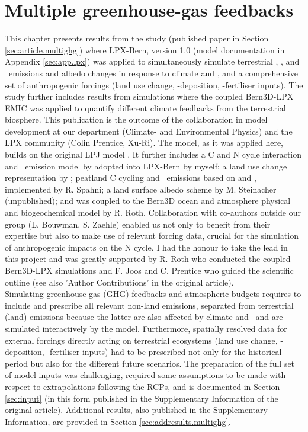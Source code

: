 \chapter{Multiple greenhouse-gas feedbacks}
\label{sec:multiGHG}
This chapter presents results from the study (published paper in Section \ref{sec:article.multighg}) where LPX-Bern, version 1.0 (model documentation in Appendix \ref{sec:app.lpx}) was applied to simultaneously simulate terrestrial \coo , \nno , and \chh\ emissions and albedo changes in response to climate and \coo , and a comprehensive set of anthropogenic forcings (land use change, \nr -deposition, \nr -fertiliser inputs). The study further includes results from simulations where the coupled Bern3D-LPX EMIC was applied to quantify different climate feedbacks from the terrestrial biosphere. This publication is the outcome of the collaboration in model development at our department (Climate- and Environmental Physics) and the LPX community (Colin Prentice, Xu-Ri). The model, as it was applied here, builds on the original LPJ model \citep{sitch03gcb}. It further includes a C and N cycle interaction and \nno\ emission model by \citet{xuri08gcb} adopted into LPX-Bern by myself; a land use change representation by \citet{strassmann08tel}; peatland C cycling and \chh\ emissions based on \citet{wania09gbca} and \citet{spahni11bg}, implemented by R. Spahni; a land surface albedo scheme by M. Steinacher (unpublished); and was coupled to the Bern3D ocean and atmosphere physical and biogeochemical model by R. Roth. Collaboration with co-authors outside our group (L. Bouwman, S. Zaehle) enabled us not only to benefit from their expertise but also to make use of relevant forcing data, crucial for the simulation of anthropogenic impacts on the N cycle. I had the honour to take the lead in this project and was greatly supported by R. Roth who conducted the coupled Bern3D-LPX simulations and F. Joos and C. Prentice who guided the scientific outline (see also 'Author Contributions' in the original article).\\

Simulating greenhouse-gas (GHG) feedbacks and atmospheric budgets requires to include and prescribe all relevant non-land emissions, separated from terrestrial (land) emissions because the latter are also affected by climate and \coo\ and are simulated interactively by the model. Furthermore, spatially resolved data for external forcings directly acting on terrestrial ecosystems (land use change, \nr -deposition, \nr -fertiliser inputs) had to be prescribed not only for the historical period but also for the different future scenarios. The preparation of the full set of model inputs was challenging, required some assumptions to be made with respect to extrapolations following the RCPs, and is documented in Section \ref{sec:input} (in this form published in the Supplementary Information of the original article). Additional results, also published in the Supplementary Information, are provided in Section \ref{sec:addresults.multighg}.


